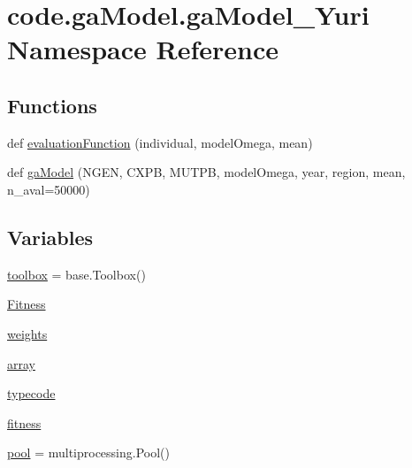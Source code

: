 \hypertarget{namespacecode_1_1ga_model_1_1ga_model___yuri}{}\section{code.\+ga\+Model.\+ga\+Model\+\_\+\+Yuri Namespace Reference}
\label{namespacecode_1_1ga_model_1_1ga_model___yuri}
\subsection*{Functions}
\begin{DoxyCompactItemize}
\item 
def \hyperlink{namespacecode_1_1ga_model_1_1ga_model___yuri_a9c1c78cf1b81c95dc2e477391409be13}{evaluation\+Function} (individual, model\+Omega, mean)
\item 
def \hyperlink{namespacecode_1_1ga_model_1_1ga_model___yuri_a4863c0a39df647a724c38d9a9a022c0b}{ga\+Model} (N\+G\+EN, C\+X\+PB, M\+U\+T\+PB, model\+Omega, year, region, mean, n\+\_\+aval=50000)
\end{DoxyCompactItemize}
\subsection*{Variables}
\begin{DoxyCompactItemize}
\item 
\hyperlink{namespacecode_1_1ga_model_1_1ga_model___yuri_ada3b1ea87dc90764c0682c880eb74eeb}{toolbox} = base.\+Toolbox()
\item 
\hyperlink{namespacecode_1_1ga_model_1_1ga_model___yuri_a4487ad90b1629e57496b29d77a0bf9f0}{Fitness}
\item 
\hyperlink{namespacecode_1_1ga_model_1_1ga_model___yuri_acd232135ed3116e17c88067961e65262}{weights}
\item 
\hyperlink{namespacecode_1_1ga_model_1_1ga_model___yuri_a479efbc9c9aa7dff9879559ce585a81c}{array}
\item 
\hyperlink{namespacecode_1_1ga_model_1_1ga_model___yuri_a977bf210ec34d4e7e9dd592a08b0d233}{typecode}
\item 
\hyperlink{namespacecode_1_1ga_model_1_1ga_model___yuri_a335cc5facfef462127df381b968df2ea}{fitness}
\item 
\hyperlink{namespacecode_1_1ga_model_1_1ga_model___yuri_a5687b52b4160bf55d1dbf2c4e8a2ff52}{pool} = multiprocessing.\+Pool()
\end{DoxyCompactItemize}


